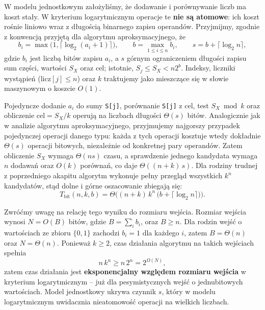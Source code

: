 \documentclass[11pt]{article}
\begin{document}
W modelu jednostkowym założyliśmy, że dodawanie i porównywanie liczb ma koszt stały. W kryterium logarytmicznym operacje te \textbf{nie są atomowe}: ich koszt rośnie liniowo wraz z długością binarnego zapisu operandów. Przyjmijmy, zgodnie z konwencją przyjętą dla algorytmu aproksymacyjnego, że
\begin{equation}
b_i=\max\bigl(1,\lceil\log_2(a_i+1)\rceil\bigr), \qquad b=\max_{1\leq i\leq n}b_i, \qquad s=b+\lceil\log_2 n\rceil,
\end{equation}
gdzie \(b_i\) jest liczbą bitów zapisu \(a_i\), a \(s\) górnym ograniczeniem długości zapisu sum części, wartości \(S_X\) oraz \(\mathrm{cel}\); istotnie, \(S_j\leq S_X<n2^b\). Indeksy, liczniki wystąpień (\(\mathrm{licz}[j]\leq n\)) oraz \(k\) traktujemy jako mieszczące się w słowie maszynowym o koszcie \(O(1)\).

Pojedyncze dodanie \(a_{i}\) do sumy \texttt{S[j]}, porównanie \texttt{S[j]} z \(\mathrm{cel}\), test \(S_X\bmod k\) oraz obliczenie \(\mathrm{cel}=S_X/k\) operują na liczbach długości \(\Theta(s)\) bitów. Analogicznie jak w analizie algorytmu aproksymacyjnego, przyjmujemy najgorszy przypadek pojedynczej operacji danego typu: każda z tych operacji kosztuje wtedy dokładnie \(\Theta(s)\) operacji bitowych, niezależnie od konkretnej pary operandów. Zatem obliczenie \(S_X\) wymaga \(\Theta(ns)\) czasu, a sprawdzenie jednego kandydata wymaga \(n\) dodawań oraz \(O(k)\) porównań, co daje \(\Theta((n+k)\,s)\). Dla rodziny trudnej z poprzedniego akapitu algorytm wykonuje pełny przegląd wszystkich \(k^n\) kandydatów, stąd dolne i górne oszacowanie zbiegają się:
\begin{equation}
\boxed{T_{\mathrm{bit}}(n,k,b)=\Theta\bigl((n+k)\,k^n\,\bigl(b+\lceil\log_2 n\rceil\bigr)\bigr).}
\end{equation}

Zwróćmy uwagę na relację tego wyniku do rozmiaru wejścia. Rozmiar wejścia wynosi \(N=O(B)\) bitów, gdzie \(B=\sum_i b_i\), oraz \(B\geq n\). Dla rodzin wejść o wartościach ze zbioru \(\{0,1\}\) zachodzi \(b_i=1\) dla każdego \(i\), zatem \(B=\Theta(n)\) oraz \(N=\Theta(n)\). Ponieważ \(k\geq2\), czas działania algorytmu na takich wejściach spełnia
\begin{equation}
n\,k^n\geq n\,2^n=2^{\Omega(N)},
\end{equation}
zatem czas działania jest \textbf{eksponencjalny względem rozmiaru wejścia} w kryterium logarytmicznym -- już dla pesymistycznych wejść o jednubitowych wartościach. Model jednostkowy ukrywa czynnik \(s\), który w modelu logarytmicznym uwidacznia nieatomowość operacji na wielkich liczbach.
\end{document}

